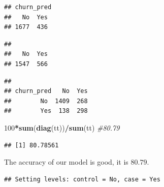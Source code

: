 \documentclass[
  twoside]{article}
\newenvironment{Shaded}{\begin{snugshade}}{\end{snugshade}}
\newcommand{\CommentTok}[1]{\textcolor[rgb]{0.56,0.35,0.01}{\textit{#1}}}
\newcommand{\DecValTok}[1]{\textcolor[rgb]{0.00,0.00,0.81}{#1}}
\newcommand{\FunctionTok}[1]{\textcolor[rgb]{0.13,0.29,0.53}{\textbf{#1}}}
\newcommand{\NormalTok}[1]{#1}
\newcommand{\OtherTok}[1]{\textcolor[rgb]{0.56,0.35,0.01}{#1}}
\newcommand{\SpecialCharTok}[1]{\textcolor[rgb]{0.81,0.36,0.00}{\textbf{#1}}}
\begin{document}
\begin{verbatim}
## churn_pred
##   No  Yes 
## 1677  436
\end{verbatim}

\begin{Shaded}
\end{Shaded}

\begin{verbatim}
## 
##   No  Yes 
## 1547  566
\end{verbatim}

\begin{Shaded}
\end{Shaded}

\begin{verbatim}
##           
## churn_pred   No  Yes
##        No  1409  268
##        Yes  138  298
\end{verbatim}

\begin{Shaded}
\begin{Highlighting}[]
\DecValTok{100}\SpecialCharTok{*}\FunctionTok{sum}\NormalTok{(}\FunctionTok{diag}\NormalTok{(tt))}\SpecialCharTok{/}\FunctionTok{sum}\NormalTok{(tt) }\CommentTok{\#80.79}
\end{Highlighting}
\end{Shaded}

\begin{verbatim}
## [1] 80.78561
\end{verbatim}

The accuracy of our model is good, it is \(80.79%
\).

\begin{Shaded}
\end{Shaded}

\begin{verbatim}
## Setting levels: control = No, case = Yes
\end{verbatim}
\end{document}
